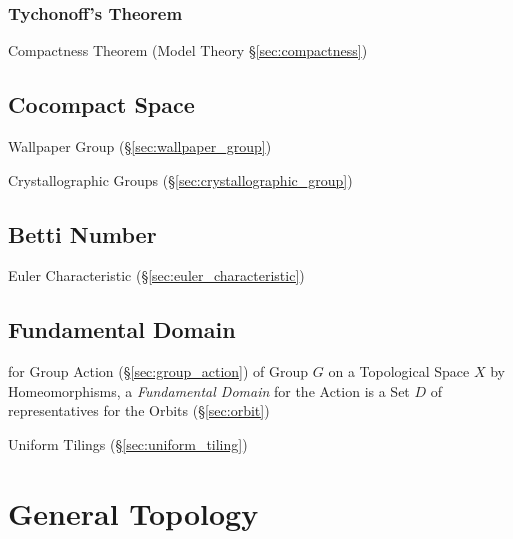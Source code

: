 \subsubsection{Tychonoff's Theorem}\label{sec:tychonoffs_theorem}

Compactness Theorem (Model Theory \S\ref{sec:compactness})



\subsection{Cocompact Space}\label{sec:cocompact_space}

Wallpaper Group (\S\ref{sec:wallpaper_group})

Crystallographic Groups (\S\ref{sec:crystallographic_group})



\subsection{Betti Number}\label{sec:betti_number}

Euler Characteristic (\S\ref{sec:euler_characteristic})



\subsection{Fundamental Domain}\label{sec:fundamental_domain}

for Group Action (\S\ref{sec:group_action}) of Group $G$ on a Topological Space
$X$ by Homeomorphisms, a \emph{Fundamental Domain} for the Action is a Set $D$
of representatives for the Orbits (\S\ref{sec:orbit})

Uniform Tilings (\S\ref{sec:uniform_tiling})



\section{General Topology}\label{sec:general_topology}

